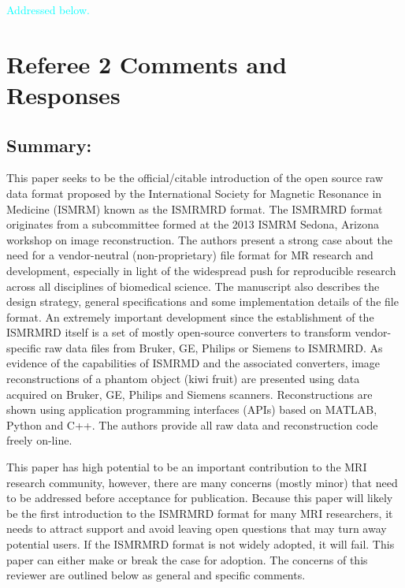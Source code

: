 \documentclass[12pt, draft]{article}
\newcommand{\response}[1]{\textcolor{cyan}{#1}}
\begin{document}
{\begin{itemize}
\response{Addressed below.}

\end{itemize}

\section*{Referee 2 Comments and Responses}
\subsection*{Summary:}
This paper seeks to be the official/citable introduction of the open source raw data format proposed by the International Society for Magnetic Resonance in Medicine (ISMRM) known as the ISMRMRD format. The ISMRMRD format originates from a subcommittee formed at the 2013 ISMRM Sedona, Arizona workshop on image reconstruction. The authors present a strong case about the need for a vendor-neutral (non-proprietary) file format for MR research and development, especially in light of the widespread push for reproducible research across all disciplines of biomedical science. The manuscript also describes the design strategy, general specifications and some implementation details of the file format. An extremely important development since the establishment of the ISMRMRD itself is a set of mostly open-source converters to transform vendor-specific raw data files from Bruker, GE, Philips or Siemens to ISMRMRD. As evidence of the capabilities of ISMRMD and the associated converters, image reconstructions of a phantom object (kiwi fruit) are presented using data acquired on Bruker, GE, Philips and Siemens scanners. Reconstructions are shown using application programming interfaces (APIs) based on MATLAB, Python and C++. The authors provide all raw data and reconstruction code freely on-line.

This paper has high potential to be an important contribution to the MRI research community, however, there are many concerns (mostly minor) that need to be addressed before acceptance for publication. Because this paper will likely be the first introduction to the ISMRMRD format for many MRI researchers, it needs to attract support and avoid leaving open questions that may turn away potential users. If the ISMRMRD format is not widely adopted, it will fail. This paper can either make or break the case for adoption. The concerns of this reviewer are outlined below as general and specific comments.

}
\end{document}

